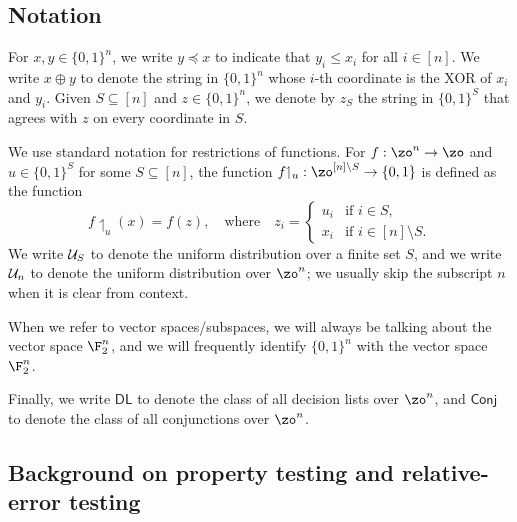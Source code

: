\documentclass[11pt]{article}
\theoremstyle{definition}
\begin{document}
\subsection{Notation} \label{sec:notation}


For $x,y \in \{0,1\}^n$, we write $y \preceq x$ to indicate that $y_i \leq x_i$ for all $i \in [n]$. 
We write $x \oplus y$ to denote the string in $\{0,1\}^n$ whose $i$-th coordinate is the XOR of $x_i$ and $y_i$.  
Given $S \subseteq [n]$ and $z \in \{0,1\}^n$, we denote by $z_S$ the string in $\{0,1\}^S$ that agrees with $z$ on every coordinate in $S$. 




We use standard notation for  restrictions of functions.  For $f: \zo^n \to \zo$ and $u\in \{0,1\}^S$ for some $S\subseteq [n]$, the function $f{\upharpoonleft_{u}}: \zo^{[n] \setminus S}\rightarrow \{0,1\}$ is defined as 
the function 
\[
f{\upharpoonleft_{u}}(x)=f(z),
\quad \text{where} \quad
z_i = 
\begin{cases}
    u_i & \text{if~}i \in S,\\
    x_i & \text{if~}i \in [n]\setminus S.
\end{cases}
\]
We write ${\cal U}_S$ to denote the uniform distribution over a finite set $S$, and we write ${\cal U}_n$ to denote the uniform distribution over $\zo^n$; we usually skip the subscript $n$ when it is clear from context.







When we refer to vector spaces/subspaces, we will always be talking about the vector space $\F_2^n$, and we will frequently identify $\{0,1\}^n$ with the vector space $\F_2^n$.

Finally, we write $\textsf{DL}$ to denote the class of all decision lists over $\zo^n$, and $\textsf{Conj}$ to denote the class of all conjunctions over $\zo^n$.

















\subsection{Background on property testing and relative-error testing} 
\label{sec:background-prop-test}
\end{document}
